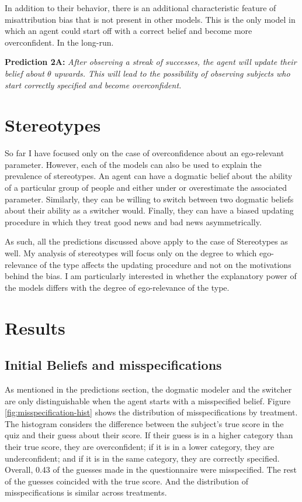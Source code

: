 \documentclass[
  12pt,
]{article}
\begin{document}
In addition to their behavior, there is an additional characteristic
feature of misattribution bias that is not present in other models. This
is the only model in which an agent could start off with a correct
belief and become more overconfident. In the long-run.

\textbf{Prediction 2A:} \emph{After observing a streak of successes, the
agent will update their belief about \(\theta\) upwards. This will lead
to the possibility of observing subjects who start correctly specified
and become overconfident.}

\hypertarget{stereotypes}{%
\section{Stereotypes}\label{stereotypes}}

So far I have focused only on the case of overconfidence about an
ego-relevant parameter. However, each of the models can also be used to
explain the prevalence of stereotypes. An agent can have a dogmatic
belief about the ability of a particular group of people and either
under or overestimate the associated parameter. Similarly, they can be
willing to switch between two dogmatic beliefs about their ability as a
switcher would. Finally, they can have a biased updating procedure in
which they treat good news and bad news asymmetrically.

As such, all the predictions discussed above apply to the case of
Stereotypes as well. My analysis of stereotypes will focus only on the
degree to which ego-relevance of the type affects the updating procedure
and not on the motivations behind the bias. I am particularly interested
in whether the explanatory power of the models differs with the degree
of ego-relevance of the type.

\hypertarget{results}{%
\section{Results}\label{results}}

\hypertarget{initial-beliefs-and-misspecifications}{%
\subsection{Initial Beliefs and
misspecifications}\label{initial-beliefs-and-misspecifications}}

As mentioned in the predictions section, the dogmatic modeler and the
switcher are only distinguishable when the agent starts with a
misspecified belief. Figure \ref{fig:misspecification-hist} shows the
distribution of misspecifications by treatment. The histogram considers
the difference between the subject's true score in the quiz and their
guess about their score. If their guess is in a higher category than
their true score, they are overconfident; if it is in a lower category,
they are underconfident; and if it is in the same category, they are
correctly specified. Overall, 0.43 of the guesses made in the
questionnaire were misspecified. The rest of the guesses coincided with
the true score. And the distribution of misspecifications is similar
across treatments.
\end{document}
